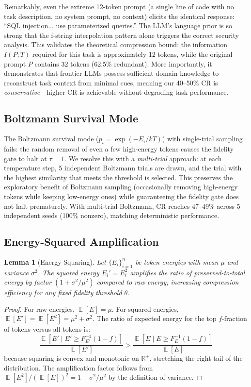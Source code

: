 \documentclass[11pt]{article}
\newtheorem{lemma}[theorem]{Lemma}
\theoremstyle{remark}
\DeclareMathOperator{\E}{\mathbb{E}}
\newcommand{\R}{\mathbb{R}}
\begin{document}
Remarkably, even the extreme 12-token prompt (a single line of code with
no task description, no system prompt, no context) elicits the identical
response: ``SQL injection... use parameterized queries.'' The LLM's
language prior is so strong that the f-string interpolation pattern alone
triggers the correct security analysis. This validates the theoretical
compression bound: the information $I(P;T)$ required for this task is
approximately 12 tokens, while the original prompt $P$ contains 32 tokens
(62.5\% redundant). More importantly, it demonstrates that frontier LLMs
possess sufficient domain knowledge to reconstruct task context from
minimal cues, meaning our 40--50\% CR is \emph{conservative}---higher CR
is achievable without degrading task performance.

\subsection{Boltzmann Survival Mode}

The Boltzmann survival mode ($p_i = \exp(-E_i/kT)$) with single-trial
sampling fails: the random removal of even a few high-energy tokens causes
the fidelity gate to halt at $\tau=1$. We resolve this with a
\emph{multi-trial} approach: at each temperature step, 5 independent
Boltzmann trials are drawn, and the trial with the highest similarity
that meets the threshold is selected. This preserves the exploratory
benefit of Boltzmann sampling (occasionally removing high-energy tokens
while keeping low-energy ones) while guaranteeing the fidelity gate does
not halt prematurely. With multi-trial Boltzmann, CR reaches 47--49\%
across 5 independent seeds (100\% nonzero), matching deterministic
performance.

\subsection{Energy-Squared Amplification}
\label{sec:squaring}

\begin{lemma}[Energy Squaring]
\label{lem:squaring}
Let $\{E_i\}_{i=1}^n$ be token energies with mean $\mu$ and variance
$\sigma^2$. The squared energy $E_i' = E_i^2$ amplifies the ratio of
preserved-to-total energy by factor $(1 + \sigma^2 / \mu^2)$ compared
to raw energy, increasing compression efficiency for any fixed fidelity
threshold $\theta$.
\end{lemma}

\begin{proof}
For raw energies, $\E[E] = \mu$. For squared energies,
$\E[E'] = \E[E^2] = \mu^2 + \sigma^2$. The ratio of expected energy
for the top $f$-fraction of tokens versus all tokens is:
\begin{equation}
    \frac{\E[E' \mid E' \geq F_{E'}^{-1}(1-f)]}{\E[E']}
    > \frac{\E[E \mid E \geq F_E^{-1}(1-f)]}{\E[E]}
\end{equation}
because squaring is convex and monotonic on $\R^+$, stretching the
right tail of the distribution. The amplification factor follows from
$\E[E^2] / (\E[E])^2 = 1 + \sigma^2/\mu^2$ by the definition of variance.
\end{proof}
\end{document}
